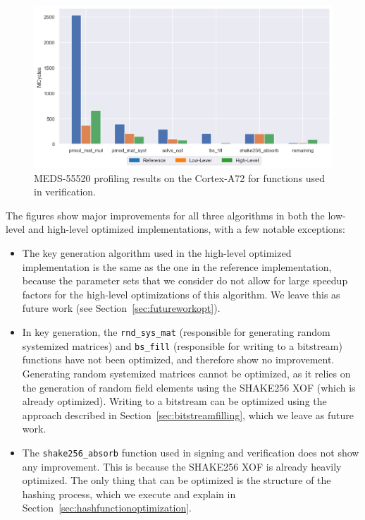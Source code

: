 \documentclass[11pt,a4paper]{report}
\theoremstyle{definition}
\begin{document}
\begin{figure}
  \centering
  \includegraphics[width=\textwidth]{plots/barplot_MEDS-55520_profile_verify.png}
  \caption{MEDS-55520 profiling results on the Cortex-A72 for functions used in verification.}
  \label{fig:results_profile_verify_MEDS-55520}
\end{figure}

The figures show major improvements for all three algorithms in both the low-level and high-level optimized implementations, with a few notable exceptions:
\begin{itemize}
  \item The key generation algorithm used in the high-level optimized implementation is the same as the one in the reference implementation, because the parameter sets that we consider do not allow for large speedup factors for the high-level optimizations of this algorithm. We leave this as future work (see Section~\ref{sec:futureworkopt}).
  \item In key generation, the \texttt{rnd\_sys\_mat} (responsible for generating random systemized matrices) and \texttt{bs\_fill} (responsible for writing to a bitstream) functions have not been optimized, and therefore show no improvement. Generating random systemized matrices cannot be optimized, as it relies on the generation of random field elements using the SHAKE256 XOF (which is already optimized). Writing to a bitstream can be optimized using the approach described in Section~\ref{sec:bitstreamfilling}, which we leave as future work.
        \pagebreak
  \item The \texttt{shake256\_absorb} function used in signing and verification does not show any improvement. This is because the SHAKE256 XOF is already heavily optimized. The only thing that can be optimized is the structure of the hashing process, which we execute and explain in Section~\ref{sec:hashfunctionoptimization}.
\end{itemize}
\end{document}
